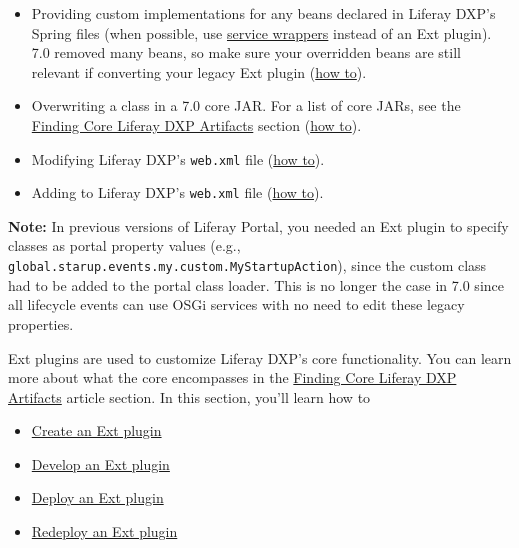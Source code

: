 \begin{itemize}
\tightlist
\item
  Providing custom implementations for any beans declared in Liferay
  DXP's Spring files (when possible, use
  \href{/docs/7-2/customization/-/knowledge_base/c/overriding-service-builder-services-service-wrappers}{service
  wrappers} instead of an Ext plugin). 7.0 removed many beans, so make
  sure your overridden beans are still relevant if converting your
  legacy Ext plugin
  (\href{/docs/7-2/customization/-/knowledge_base/c/extending-core-classes-using-spring-with-ext-plugins}{how
  to}).
\item
  Overwriting a class in a 7.0 core JAR. For a list of core JARs, see
  the
  \href{/docs/7-2/customization/-/knowledge_base/c/finding-artifacts\#finding-core-artifact-attributes}{Finding
  Core Liferay DXP Artifacts} section
  (\href{/docs/7-2/customization/-/knowledge_base/c/overriding-core-classes-with-ext-plugins}{how
  to}).
\item
  Modifying Liferay DXP's \texttt{web.xml} file
  (\href{/docs/7-2/customization/-/knowledge_base/c/modifying-the-web-xml-with-ext-plugins}{how
  to}).
\item
  Adding to Liferay DXP's \texttt{web.xml} file
  (\href{/docs/7-2/customization/-/knowledge_base/c/adding-to-the-web-xml-with-ext-plugins}{how
  to}).
\end{itemize}

\textbf{Note:} In previous versions of Liferay Portal, you needed an Ext
plugin to specify classes as portal property values (e.g.,
\texttt{global.starup.events.my.custom.MyStartupAction}), since the
custom class had to be added to the portal class loader. This is no
longer the case in 7.0 since all lifecycle events can use OSGi services
with no need to edit these legacy properties.

\noindent\hrulefill

Ext plugins are used to customize Liferay DXP's core functionality. You
can learn more about what the core encompasses in the
\href{/docs/7-2/customization/-/knowledge_base/c/finding-artifacts\#finding-core-artifact-attributes}{Finding
Core Liferay DXP Artifacts} article section. In this section, you'll
learn how to

\begin{itemize}
\tightlist
\item
  \href{/docs/7-2/customization/-/knowledge_base/c/creating-an-ext-plugin}{Create
  an Ext plugin}
\item
  \href{/docs/7-2/customization/-/knowledge_base/c/developing-an-ext-plugin}{Develop
  an Ext plugin}
\item
  \href{/docs/7-2/customization/-/knowledge_base/c/deploying-an-ext-plugin}{Deploy
  an Ext plugin}
\item
  \href{/docs/7-2/customization/-/knowledge_base/c/redeploying-an-ext-plugin}{Redeploy
  an Ext plugin}
\end{itemize}

